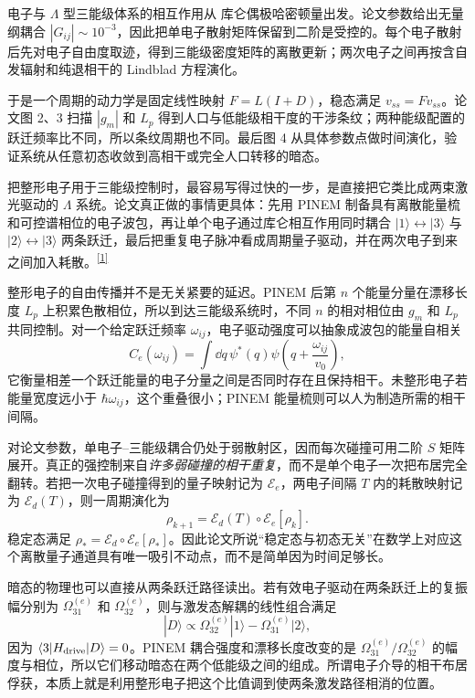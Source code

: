 电子与 $\Lambda$ 型三能级体系的相互作用从 库仑偶极哈密顿量出发。论文参数给出无量纲耦合 $|G_{ij}|\sim10^{-3}$，因此把单电子散射矩阵保留到二阶是受控的。每个电子散射后先对电子自由度取迹，得到三能级密度矩阵的离散更新；两次电子之间再按含自发辐射和纯退相干的 Lindblad 方程演化。

于是一个周期的动力学是固定线性映射 $F=L(I+D)$，稳态满足 $v_{ss}=Fv_{ss}$。论文图 2、3 扫描 $|g_m|$ 和 $L_p$ 得到人口与低能级相干度的干涉条纹；两种能级配置的跃迁频率比不同，所以条纹周期也不同。最后图 4 从具体参数点做时间演化，验证系统从任意初态收敛到高相干或完全人口转移的暗态。


把整形电子用于三能级控制时，最容易写得过快的一步，是直接把它类比成两束激光驱动的 $\Lambda$ 系统。论文真正做的事情更具体：先用 PINEM 制备具有离散能量梳和可控谱相位的电子波包，再让单个电子通过库仑相互作用同时耦合 $|1\rangle\leftrightarrow|3\rangle$ 与 $|2\rangle\leftrightarrow|3\rangle$ 两条跃迁，最后把重复电子脉冲看成周期量子驱动，并在两次电子到来之间加入耗散。\textsuperscript{\hyperref[ch05-ref1]{[1]}}

整形电子的自由传播并不是无关紧要的延迟。PINEM 后第 $n$ 个能量分量在漂移长度 $L_p$ 上积累色散相位，所以到达三能级系统时，不同 $n$ 的相对相位由 $g_m$ 和 $L_p$ 共同控制。对一个给定跃迁频率 $\omega_{ij}$，电子驱动强度可以抽象成波包的能量自相关
\begin{equation}
C_e(\omega_{ij})=\int\dd  q\,\psi^*(q)\psi\!\left(q+\frac{\omega_{ij}}{v_0}\right),
\label{eq:ch05-electron-autocorr}
\end{equation}
它衡量相差一个跃迁能量的电子分量之间是否同时存在且保持相干。未整形电子若能量宽度远小于 $\hbar\omega_{ij}$，这个重叠很小；PINEM 能量梳则可以人为制造所需的相干间隔。

对论文参数，单电子--三能级耦合仍处于弱散射区，因而每次碰撞可用二阶 $S$ 矩阵展开。真正的强控制来自\emph{许多弱碰撞的相干重复}，而不是单个电子一次把布居完全翻转。若把一次电子碰撞得到的量子映射记为 $\mathcal E_e$，两电子间隔 $T$ 内的耗散映射记为 $\mathcal E_d(T)$，则一周期演化为
\begin{equation}
\rho_{k+1}=\mathcal E_d(T)\circ\mathcal E_e[\rho_k].
\label{eq:ch05-stroboscopic-map}
\end{equation}
稳定态满足 $\rho_*=\mathcal E_d\circ\mathcal E_e[\rho_*]$。因此论文所说“稳定态与初态无关”在数学上对应这个离散量子通道具有唯一吸引不动点，而不是简单因为时间足够长。

暗态的物理也可以直接从两条跃迁路径读出。若有效电子驱动在两条跃迁上的复振幅分别为 $\Omega_{31}^{(e)}$ 和 $\Omega_{32}^{(e)}$，则与激发态解耦的线性组合满足
\begin{equation}
|D\rangle\propto \Omega_{32}^{(e)}|1\rangle-\Omega_{31}^{(e)}|2\rangle,
\label{eq:ch05-dark-state}
\end{equation}
因为 $\langle3|H_{\rm drive}|D\rangle=0$。PINEM 耦合强度和漂移长度改变的是 $\Omega_{31}^{(e)}/\Omega_{32}^{(e)}$ 的幅度与相位，所以它们移动暗态在两个低能级之间的组成。所谓电子介导的相干布居俘获，本质上就是利用整形电子把这个比值调到使两条激发路径相消的位置。

